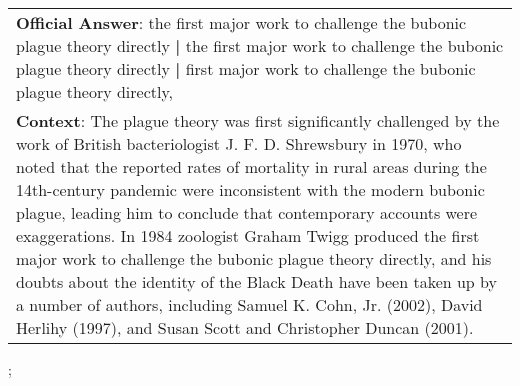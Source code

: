 \begin{figure*}[ht]
{\begin{tabular}{p{}}
            \textbf{Official Answer}: the first major work to challenge the bubonic plague theory directly \textbf{|} the first major work to challenge the bubonic plague theory directly \textbf{|} first major work to challenge the bubonic plague theory directly,                                                                                                                                                                                                                                                                                                                                                                                                                                \\
            \textbf{Context}: The plague theory was first significantly challenged by the work of British bacteriologist J. F. D. Shrewsbury in 1970, who noted that the reported rates of mortality in rural areas during the 14th-century pandemic were inconsistent with the modern bubonic plague, leading him to conclude that contemporary accounts were exaggerations. In 1984 zoologist Graham Twigg produced the first major work to challenge the bubonic plague theory directly, and his doubts about the identity of the Black Death have been taken up by a number of authors, including Samuel K. Cohn, Jr. (2002), David Herlihy (1997), and Susan Scott and Christopher Duncan (2001). \\
        \end{tabular}
    };
    \label{fig:ex-5726509bdd62a815002e815d}
\end{figure*}

